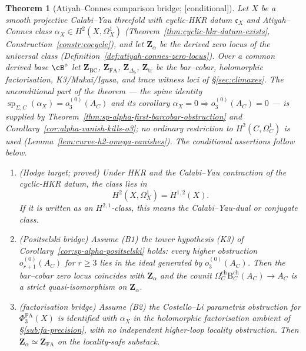 \documentclass[11pt,reqno]{amsart}
\theoremstyle{plain}
\newtheorem{theorem}{Theorem}[section]
\theoremstyle{definition}
\theoremstyle{remark}
\providecommand{\ClaimStatusConditional}{\textnormal{[conditional]}}
\newcommand{\Bar}{\mathrm{B}}
\newcommand{\Cobar}{\Omega}
\begin{document}
\begin{theorem}[Atiyah--Connes comparison bridge; \ClaimStatusConditional]
\label{thm:main}
Let $X$ be a smooth projective Calabi--Yau threefold with cyclic-HKR
datum $\mathfrak c_X$ and Atiyah--Connes class
$\alpha_X\in H^2(X,\Omega^1_X)$
(Theorem~\ref{thm:cyclic-hkr-datum-exists},
Construction~\ref{constr:cocycle}), and let $\mathbf Z_\alpha$ be the
derived zero locus of the universal class
(Definition~\ref{def:atiyah-connes-zero-locus}). Over a common derived
base $\cB^\circ$ let $\mathbf Z_{\mathrm{BC}}$,
$\mathbf Z_{\mathrm{FA}}$, $\mathbf Z_{\Delta_5}$,
$\mathbf Z_{\mathrm{tr}}$ be the bar--cobar, holomorphic factorisation,
K3/Mukai/Igusa, and trace witness loci of \S\ref{sec:climaxes}. The
unconditional part of the theorem --- the spine identity
$\operatorname{sp}_{\Sigma,C}(\alpha_X)=o^{(0)}_3(A_C)$ and its
corollary $\alpha_X=0\Rightarrow o^{(0)}_3(A_C)=0$ --- is supplied by
Theorem~\ref{thm:sp-alpha-first-barcobar-obstruction} and
Corollary~\ref{cor:alpha-vanish-kills-o3}; no ordinary restriction to
$H^2(C,\Omega^1_C)$ is used
(Lemma~\ref{lem:curve-h2-omega-vanishes}). The conditional assertions
follow below.
\begin{enumerate}[label=\textup{(\roman*)}]
  \item \textup{(Hodge target; proved)} Under HKR and the Calabi--Yau
  contraction of the cyclic-HKR datum, the class lies in
  \[
    H^2(X,\Omega^1_X)=H^{1,2}(X).
  \]
  If it is written as an $H^{2,1}$-class, this means the Calabi--Yau-dual or conjugate class.

  \item \textup{(Positselski bridge)} Assume \textup{(B1)} the tower
  hypothesis \textup{(K3)} of
  Corollary~\ref{cor:sp-alpha-positselski} holds: every higher
  obstruction $o^{(0)}_{r+1}(A_C)$ for $r\geq 3$ lies in the ideal
  generated by $o^{(0)}_3(A_C)$. Then the bar--cobar zero locus
  coincides with $\mathbf Z_\alpha$ and the counit
  $\Cobar_C^{\mathrm{ch}}\Bar_C^{\mathrm{ch}}(A_C)\to A_C$ is a strict
  quasi-isomorphism on $\mathbf Z_\alpha$.

  \item \textup{(factorisation bridge)} Assume \textup{(B2)} the
  Costello--Li parametrix obstruction for $\Phi^{\mathrm{FA}}_3(X)$ is
  identified with $\alpha_X$ in the holomorphic factorisation ambient
  of \S\ref{sub:fa-precision}, with no independent higher-loop
  locality obstruction. Then
  $\mathbf Z_\alpha\simeq\mathbf Z_{\mathrm{FA}}$ on the locality-safe
  substack.


\end{enumerate}
\end{theorem}
\end{document}
